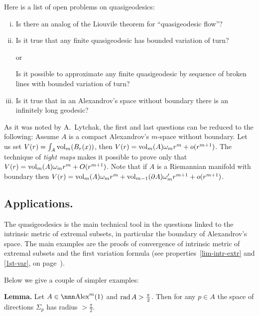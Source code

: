 \documentclass{article}
\begin{document}
\noi Here is a list of open problems on quasigeodesics:

\begin{enumerate}[(i)]
\item Is there an analog of the Liouvile theorem for ``quasigeodesic flow''?
\item Is it true that any finite quasigeodesic has bounded variation of turn?  

or

Is it possible to approximate any finite quasigeodesic by sequence of
broken lines with bounded variation of turn?

\item Is it true that in an Alexandrov's space without boundary there is an
infinitely long geodesic?
\end{enumerate}

As it was noted by A.~Lytchak, the first and last questions can be reduced to the following:
Assume $A$ is a compact Alexandrov's $m$-space without boundary. Let us set
$V(r)=\int_A\operatorname{vol}_m(B_r(x))$,
then $V(r)=\operatorname{vol}_m(A)\omega_m r^m+o(r^{m+1})$.
The technique of \emph{tight maps} makes it possible to prove only that
$V(r)\z=\vol_m(A)\omega_m r^m+O(r^{m+1})$.
Note that if $A$ is a Riemannian manifold with boundary then $V(r)=\operatorname{vol}_m(A)\omega_m r^m+\operatorname{vol}_{m-1}(\partial A)\omega'_m
r^{m+1}+o(r^{m+1})$.









\subsection{Applications.}

The quasigeodesics is the main technical tool in the questions linked to the intrinsic
metric of extremal subsets, in particular the boundary of Alexandrov's space. 
The main examples are
the proofs of convergence of intrinsic metric of extremal subsets and
the first variation formula (see properties~\ref{lim-intr-extr} and \ref{1st-var}, on page~\pageref{lim-intr-extr}).
 
Below  we give a couple of simpler examples:

\begin{thm}{\bf Lemma.}\label{lemma:rad-big-U_p}
Let $A\in\Alex^m(1)$  and  $\operatorname{rad} A>\tfrac\pi2$. 
Then for any $p\in A$
the space of directions $\Sigma_p$ has radius $> \tfrac\pi2$.
\end{thm}
\end{document}
